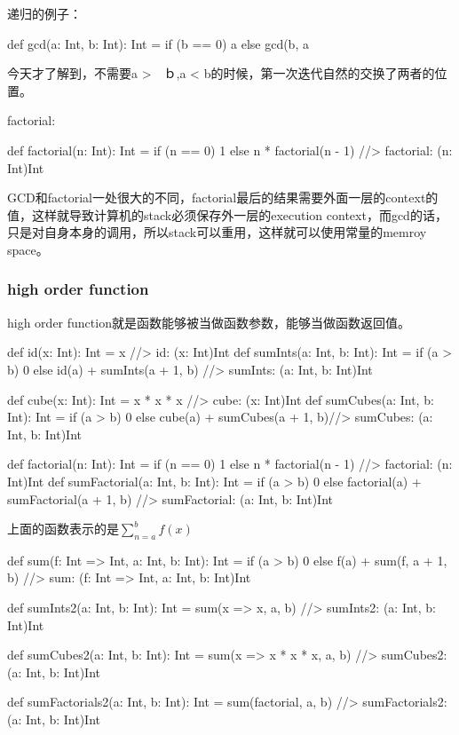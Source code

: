递归的例子：
\begin{Scala}[GCD]
def gcd(a: Int, b: Int): Int = if (b == 0) a else gcd(b, a %
\end{Scala}
今天才了解到，不需要a >　ｂ,a < b的时候，第一次迭代自然的交换了两者的位置。

factorial:
\begin{Scala}
  def factorial(n: Int): Int =
    if (n == 0) 1 else n * factorial(n - 1)       //> factorial: (n: Int)Int
\end{Scala}
GCD和factorial一处很大的不同，factorial最后的结果需要外面一层的context的值，这样就导致计算机的stack必须保存外一层的execution context，而gcd的话，只是对自身本身的调用，所以stack可以重用，这样就可以使用常量的memroy space。


\subsubsection{high order function}
high order function就是函数能够被当做函数参数，能够当做函数返回值。

\begin{Scala}
  def id(x: Int): Int = x                         //> id: (x: Int)Int
  def sumInts(a: Int, b: Int): Int =
    if (a > b) 0 else id(a) + sumInts(a + 1, b)   //> sumInts: (a: Int, b: Int)Int

  def cube(x: Int): Int = x * x * x               //> cube: (x: Int)Int
  def sumCubes(a: Int, b: Int): Int =
    if (a > b) 0 else cube(a) + sumCubes(a + 1, b)//> sumCubes: (a: Int, b: Int)Int

  def factorial(n: Int): Int =
    if (n == 0) 1 else n * factorial(n - 1)       //> factorial: (n: Int)Int
  def sumFactorial(a: Int, b: Int): Int =
    if (a > b) 0 else factorial(a) + sumFactorial(a + 1, b)
                                                  //> sumFactorial: (a: Int, b: Int)Int
\end{Scala}

上面的函数表示的是$\sum_{n=a}^{b}f(x)$

\begin{Scala}
  def sum(f: Int => Int, a: Int, b: Int): Int =
    if (a > b) 0 else f(a) + sum(f, a + 1, b)     //> sum: (f: Int => Int, a: Int, b: Int)Int

  def sumInts2(a: Int, b: Int): Int = sum(x => x, a, b)
                                                  //> sumInts2: (a: Int, b: Int)Int

  def sumCubes2(a: Int, b: Int): Int = sum(x => x * x * x, a, b)
                                                  //> sumCubes2: (a: Int, b: Int)Int

  def sumFactorials2(a: Int, b: Int): Int = sum(factorial, a, b)
                                                  //> sumFactorials2: (a: Int, b: Int)Int
\end{Scala}

